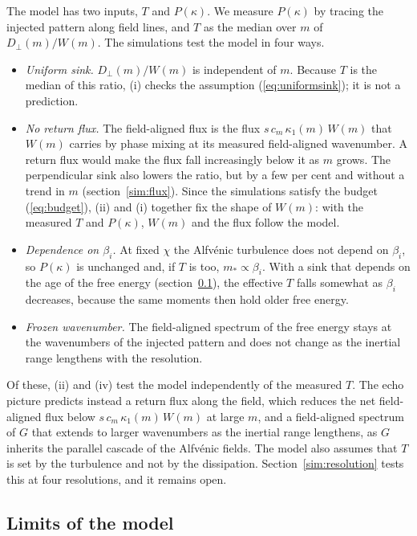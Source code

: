 The model has two inputs, $T$ and $P(\kappa)$. We measure $P(\kappa)$ by tracing the injected pattern along field lines, and $T$ as the median over $m$ of $D_\perp(m)/W(m)$. The simulations test the model in four ways.
\begin{itemize}
\item[(i)] \emph{Uniform sink.} $D_\perp(m)/W(m)$ is independent of $m$. Because $T$ is the median of this ratio, (i) checks the assumption (\ref{eq:uniformsink}); it is not a prediction.
\item[(ii)] \emph{No return flux.} The field-aligned flux is the flux $s\,c_m\,\kappa_1(m)\,W(m)$ that $W(m)$ carries by phase mixing at its measured field-aligned wavenumber. A return flux would make the flux fall increasingly below it as $m$ grows. The perpendicular sink also lowers the ratio, but by a few per cent and without a trend in $m$ (section~\ref{sim:flux}). Since the simulations satisfy the budget (\ref{eq:budget}), (ii) and (i) together fix the shape of $W(m)$: with the measured $T$ and $P(\kappa)$, $W(m)$ and the flux follow the model.
\item[(iii)] \emph{Dependence on $\beta_i$.} At fixed $\chi$ the Alfv\'enic turbulence does not depend on $\beta_i$, so $P(\kappa)$ is unchanged and, if $T$ is too, $m_*\propto\beta_i$. With a sink that depends on the age of the free energy (section~\ref{tc:limits}), the effective $T$ falls somewhat as $\beta_i$ decreases, because the same moments then hold older free energy.
\item[(iv)] \emph{Frozen wavenumber.} The field-aligned spectrum of the free energy stays at the wavenumbers of the injected pattern and does not change as the inertial range lengthens with the resolution.
\end{itemize}
Of these, (ii) and (iv) test the model independently of the measured $T$. The echo picture \citep{Meyrand2019} predicts instead a return flux along the field, which reduces the net field-aligned flux below $s\,c_m\,\kappa_1(m)\,W(m)$ at large $m$, and a field-aligned spectrum of $G$ that extends to larger wavenumbers as the inertial range lengthens, as $G$ inherits the parallel cascade of the Alfv\'enic fields. The model also assumes that $T$ is set by the turbulence and not by the dissipation. Section~\ref{sim:resolution} tests this at four resolutions, and it remains open.

\subsection{Limits of the model}\label{tc:limits}

